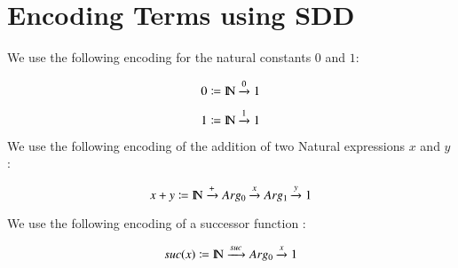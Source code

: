\section{Encoding Terms using SDD}
\label{sec:cod}


We use the following encoding for the natural constants $0$ and $1$:

$$
0 \coloneqq  \mbox{${\rm I\!N}$} \xrightarrow{\scriptstyle {0}} 1
$$

$$
1 \coloneqq \mbox{${\rm I\!N}$} \xrightarrow{\scriptstyle {1}} 1 
$$

We use the following encoding of the addition of two Natural expressions $x$ and $y$ :

$$
x + y \coloneqq \mbox{${\rm I\!N}$} \xrightarrow{\scriptstyle {+}} Arg_0 \xrightarrow{\scriptstyle {x}} Arg_1 \xrightarrow{\scriptstyle {y}} 1 
$$

We use the following encoding of a successor function :

$$
suc(x) \coloneqq \mbox{${\rm I\!N}$} \xrightarrow{\scriptstyle {suc}} Arg_0 \xrightarrow{\scriptstyle {x}} 1
$$


